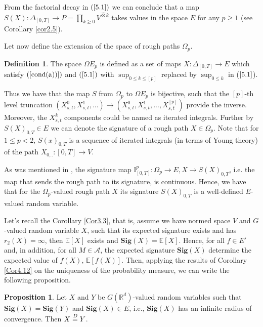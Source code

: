 \documentclass[12pt,a4paper]{report}
\theoremstyle{definition}
\newtheorem{proposition}{Proposition}
\newtheorem{definition}{Definition}
\begin{document}
 From the factorial decay in $(\ref{5.1})$ we can conclude that a map $S(X):\Delta_{[0,T]} \rightarrow P=\prod_{k\geq 0}V^{\hat{\otimes}k}$ takes values in the space $E$ for any $p \geq 1$ (see Corollary \ref{cor2.5}).
 
 Let now define the extension of the space of rough paths $\Omega_p$. 
 \begin{definition}
	The space $\Omega E_p$ is defined as a set of maps $X : \Delta_{[0,T]} \rightarrow E$ which satisfy $(\ref{cond(a))})$ and $(\ref{5.1})$ with $\sup_{0\leq k \leq [p]}$ replaced by $\sup_{0\leq k}$ in ($\ref{5.1}$).
 \end{definition}
 Thus we have that the map $S$ from $\Omega_p$ to $\Omega E_p$ is bijective, such that the $[p]$-th level truncation $(X_{s,t}^0, X_{s,t}^1, . . .) \rightarrow (X_{s,t}^0, X_{s,t}^1, . . . , X_{s,t}^{[p]})$ provide the inverse. Moreover, the $X_{s,t}^k$ components could be named as iterated integrals.
 Further by $S(X)_{0,T} \in E$ we can denote the signature of a rough path $X \in \Omega_p$. Note that for $1\leq p <2$, $S(x)_{0,T} $ is a sequence of iterated integrals (in terms of Young theory) of the path $X_{0,.}:[0,T]\rightarrow V$.

As was mentioned in \parencite[][Corollary 5.5]{chevyrev2016characteristic}, the signature map $\mathbb{I}^p_{[0,T]}:\Omega_p \rightarrow E,  X \rightarrow S(X)_{0,T}$, i.e. the map that sends the rough path to its signature, is continuous. Hence, we have that for the  $\Omega_p$-valued rough path $X$ its signature $S(X)_{0,T}$  is a well-defined $E$-valued random variable.

Let's recall the Corollary \ref{Cor3.3}, that is, assume we have normed space $V$ and $G$-valued random variable $X$, such that its expected signature exists and has $r_2(X)=\infty$, then $\mathbb{E}[X]$ exists and $\textbf{Sig}(X)=\mathbb{E}[X]$. Hence, for all $f \in E'$ and, in addition, for all $M \in \mathcal{A}$, the expected signature $\textbf{Sig}(X)$ determine the expected value of $f(X)$, $\mathbb{E}[f(X)]$. Then, applying the results of Corollary \ref{Cor4.12} on the uniqueness of the probability measure, we can write the following proposition.

\begin{proposition}\label{Prop6.1} \parencite[see][]{chevyrev2016characteristic}
	Let $X$ and $Y$ be $G(\mathbb{R}^d)$-valued random variables such that $\textbf{Sig}(X) = \textbf{Sig}(Y)$ and $\textbf{Sig}(X) \in E$, i.e., $\textbf{Sig}(X)$ has an infinite radius of convergence. Then $X \stackrel{\text{\textit{D}}}{=} Y$.
\end{proposition}
\end{document}
